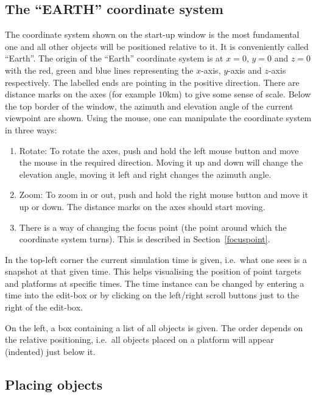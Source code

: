 \subsection{The ``EARTH'' coordinate system}

The coordinate system shown on the start-up window is the most fundamental
one and all other objects will be positioned relative to it. It is
conveniently called ``Earth''. The origin of the ``Earth'' coordinate system
is at $x=0$, $y=0$ and $z=0$ with the red, green and blue lines representing
the $x$-axis, $y$-axis and $z$-axis respectively. The labelled ends are
pointing in the positive direction. There are distance marks on the axes
(for example $10$\thinspace km) to give some sense of scale. Below the top
border of the window, the azimuth and elevation angle of the current
viewpoint are shown. Using the mouse, one can manipulate the coordinate
system in three ways:

\begin{enumerate}
\item  Rotate: To rotate the axes, push and hold the left mouse button and
move the mouse in the required direction. Moving it up and down will change
the elevation angle, moving it left and right changes the azimuth angle.

\item  Zoom: To zoom in or out, push and hold the right mouse button and
move it up or down. The distance marks on the axes should start moving.

\item  There is a way of changing the focus point (the point around which
the coordinate system turns). This is described in Section~\ref{focuspoint}.
\end{enumerate}

In the top-left corner the current simulation time is given, i.e.~what one
sees is a snapshot at that given time. This helps visualising the position
of point targets and platforms at specific times. The time instance can be
changed by entering a time into the edit-box or by clicking on the
left/right scroll buttons just to the right of the edit-box.

On the left, a box containing a list of all objects is given. The order
depends on the relative positioning, i.e.~all objects placed on a platform
will appear (indented) just below it.

\subsection{Placing objects}

